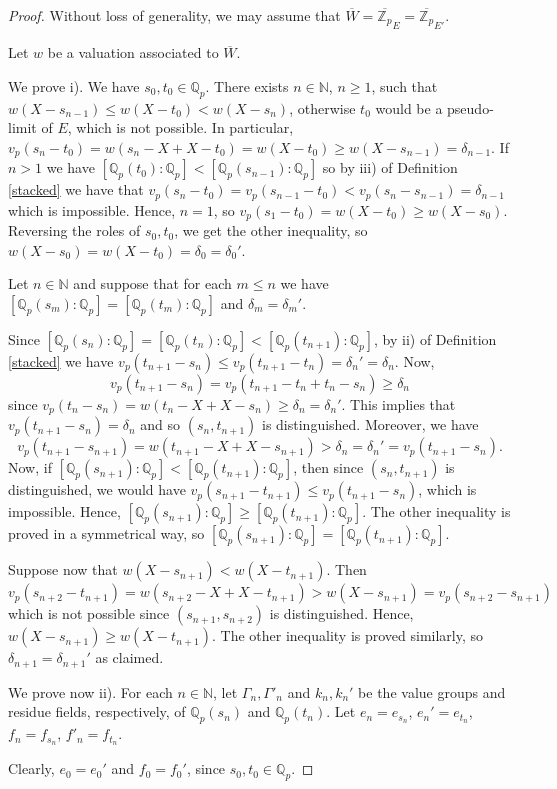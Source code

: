 \documentclass[10pt]{article}
\numberwithin{equation}{section}
\theoremstyle{definition}\newtheorem{Def}[equation]{Definition}
\theoremstyle{definition}\newtheorem{Ques}[equation]{Question}
\newcommand{\Q}{\mathbb{Q}}
\newcommand{\N}{\mathbb{N}}
\newcommand{\Z}{\mathbb{Z}}
\newcommand{\oZp}{\overline{\Z_p}}
\begin{document}
\begin{proof}
Without loss of generality, we may assume that $\overline W=\oZp_E=\oZp_{E'}$.

Let $w$ be a valuation associated to $\overline W$. 

We prove i). We have $s_0,t_0\in\Q_p$. There exists $n\in\N$, $n\geq1$, such that $w(X-s_{n-1})\leq w(X-t_0)<w(X-s_n)$, otherwise $t_0$ would be a pseudo-limit of $E$, which is not possible. In particular, $v_p(s_n-t_0)=w(s_n-X+X-t_0)=w(X-t_0)\geq w(X-s_{n-1})=\delta_{n-1}$. If $n>1$ we have $[\Q_p(t_0):\Q_p]<[\Q_p(s_{n-1}):\Q_p]$ so by iii) of Definition \ref{stacked} we have that $v_p(s_n-t_0)=v_p(s_{n-1}-t_0)<v_p(s_n-s_{n-1})=\delta_{n-1}$ which   is impossible. Hence, $n=1$, so $v_p(s_1-t_0)=w(X-t_0)\geq w(X-s_0)$. Reversing the roles of $s_0,t_0$, we get the other inequality, so $w(X-s_0)=w(X-t_0)=\delta_0=\delta_0'$.

Let $n\in\N$ and suppose that for each $m\leq n$ we have $[\Q_p(s_m):\Q_p]=[\Q_p(t_m):\Q_p]$ and $\delta_m=\delta_m'$.

Since $[\Q_p(s_{n}):\Q_p]=[\Q_p(t_{n}):\Q_p]<[\Q_p(t_{n+1}):\Q_p]$, by ii) of Definition \ref{stacked} we have  $v_p(t_{n+1}-s_n)\leq v_p(t_{n+1}-t_n)=\delta_n'=\delta_n$. Now, 
$$v_p(t_{n+1}-s_n)=v_p(t_{n+1}-t_n+t_n-s_n)\geq\delta_n$$
since $v_p(t_n-s_n)=w(t_n-X+X-s_n)\geq \delta_n=\delta_n'$. This implies that $v_p(t_{n+1}-s_n)=\delta_n$ and so $(s_n,t_{n+1})$  is distinguished. Moreover, we have
$$v_p(t_{n+1}-s_{n+1})=w(t_{n+1}-X+X-s_{n+1})>\delta_n=\delta_n'=v_p(t_{n+1}-s_n).$$
Now, if $[\Q_p(s_{n+1}):\Q_p]< [\Q_p(t_{n+1}):\Q_p]$, then since $(s_n,t_{n+1})$ is distinguished, we would have $v_p(s_{n+1}-t_{n+1})\leq v_p(t_{n+1}-s_n)$, which is impossible. Hence, $[\Q_p(s_{n+1}):\Q_p]\geq [\Q_p(t_{n+1}):\Q_p]$. The other inequality is proved in a symmetrical way, so $[\Q_p(s_{n+1}):\Q_p]= [\Q_p(t_{n+1}):\Q_p]$.

Suppose now that $w(X-s_{n+1})<w(X-t_{n+1})$. Then $v_p(s_{n+2}-t_{n+1})=w(s_{n+2}-X+X-t_{n+1})>w(X-s_{n+1})=v_p(s_{n+2}-s_{n+1})$ which is not possible since $(s_{n+1},s_{n+2})$ is distinguished. Hence, $w(X-s_{n+1})\geq w(X-t_{n+1})$. The other inequality is proved similarly, so $\delta_{n+1}=\delta_{n+1}'$ as claimed.

We prove now ii). For each $n\in\N$, let $\Gamma_n,\Gamma'_n$ and $k_n,k_n'$ be the value groups and residue fields, respectively, of $\Q_p(s_n)$ and $\Q_p(t_n)$. Let $e_n=e_{s_n}$, $e_n'=e_{t_n}$, $f_n=f_{s_n}$, $f'_n=f_{t_n}$.

Clearly, $e_0=e_0'$ and $f_0=f_0'$, since $s_0,t_0\in\Q_p$. 


\end{proof}
\end{document}
